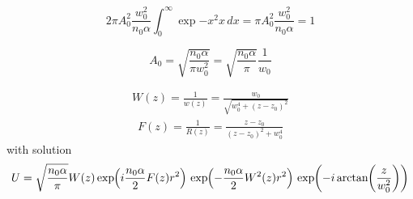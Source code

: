 \begin{equation}
2 \pi A^2_0 \frac{w_0^2}{n_0 \alpha }  \int_{0}^{\infty}\exp{-x^2}  x \, dx = \pi A^2_0 \frac{w_0^2}{n_0 \alpha } = 1
\end{equation}

\begin{equation}
A_0 = \sqrt{\frac{n_0 \alpha }{\pi w_0^2}} = \sqrt{\frac{n_0 \alpha }{\pi}} \frac{1}{w_0}
\end{equation}


\begin{equation}
\begin{split}
   W(z) = \frac{1}{w(z)} = \frac{w_0}{\sqrt{w_0^4+\left(z-z_0\right)^2}} 
\end{split}
\end{equation}
\begin{equation}
\begin{split}
   F(z) = \frac{1}{R(z)} = \frac{z-z_0}{(z-z_0)^2 + w_0^4}
\end{split}
\end{equation}
with solution 
\begin{equation}
\begin{split}
   U  = \sqrt{\frac{n_0 \alpha}{\pi}} W(z) \exp{i\frac{n_0 \alpha}{2} F(z) r^2} \exp{- \frac{n_0 \alpha}{2} W^2(z) r^2} \exp{-i \atan{ \frac{z}{w_0^2} } }
\end{split}
\end{equation}










